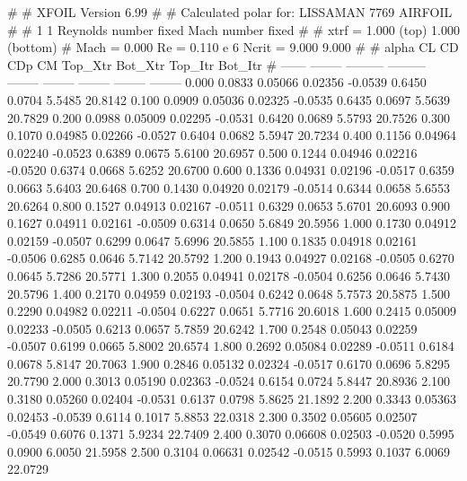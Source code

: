 #  
#       XFOIL         Version 6.99
#  
# Calculated polar for: LISSAMAN 7769 AIRFOIL                           
#  
# 1 1 Reynolds number fixed          Mach number fixed         
#  
# xtrf =   1.000 (top)        1.000 (bottom)  
# Mach =   0.000     Re =     0.110 e 6     Ncrit =   9.000  9.000
#  
#   alpha    CL        CD       CDp       CM     Top_Xtr  Bot_Xtr  Top_Itr  Bot_Itr
#  ------ -------- --------- --------- -------- -------- -------- -------- --------
   0.000   0.0833   0.05066   0.02356  -0.0539   0.6450   0.0704   5.5485  20.8142
   0.100   0.0909   0.05036   0.02325  -0.0535   0.6435   0.0697   5.5639  20.7829
   0.200   0.0988   0.05009   0.02295  -0.0531   0.6420   0.0689   5.5793  20.7526
   0.300   0.1070   0.04985   0.02266  -0.0527   0.6404   0.0682   5.5947  20.7234
   0.400   0.1156   0.04964   0.02240  -0.0523   0.6389   0.0675   5.6100  20.6957
   0.500   0.1244   0.04946   0.02216  -0.0520   0.6374   0.0668   5.6252  20.6700
   0.600   0.1336   0.04931   0.02196  -0.0517   0.6359   0.0663   5.6403  20.6468
   0.700   0.1430   0.04920   0.02179  -0.0514   0.6344   0.0658   5.6553  20.6264
   0.800   0.1527   0.04913   0.02167  -0.0511   0.6329   0.0653   5.6701  20.6093
   0.900   0.1627   0.04911   0.02161  -0.0509   0.6314   0.0650   5.6849  20.5956
   1.000   0.1730   0.04912   0.02159  -0.0507   0.6299   0.0647   5.6996  20.5855
   1.100   0.1835   0.04918   0.02161  -0.0506   0.6285   0.0646   5.7142  20.5792
   1.200   0.1943   0.04927   0.02168  -0.0505   0.6270   0.0645   5.7286  20.5771
   1.300   0.2055   0.04941   0.02178  -0.0504   0.6256   0.0646   5.7430  20.5796
   1.400   0.2170   0.04959   0.02193  -0.0504   0.6242   0.0648   5.7573  20.5875
   1.500   0.2290   0.04982   0.02211  -0.0504   0.6227   0.0651   5.7716  20.6018
   1.600   0.2415   0.05009   0.02233  -0.0505   0.6213   0.0657   5.7859  20.6242
   1.700   0.2548   0.05043   0.02259  -0.0507   0.6199   0.0665   5.8002  20.6574
   1.800   0.2692   0.05084   0.02289  -0.0511   0.6184   0.0678   5.8147  20.7063
   1.900   0.2846   0.05132   0.02324  -0.0517   0.6170   0.0696   5.8295  20.7790
   2.000   0.3013   0.05190   0.02363  -0.0524   0.6154   0.0724   5.8447  20.8936
   2.100   0.3180   0.05260   0.02404  -0.0531   0.6137   0.0798   5.8625  21.1892
   2.200   0.3343   0.05363   0.02453  -0.0539   0.6114   0.1017   5.8853  22.0318
   2.300   0.3502   0.05605   0.02507  -0.0549   0.6076   0.1371   5.9234  22.7409
   2.400   0.3070   0.06608   0.02503  -0.0520   0.5995   0.0900   6.0050  21.5958
   2.500   0.3104   0.06631   0.02542  -0.0515   0.5993   0.1037   6.0069  22.0729
